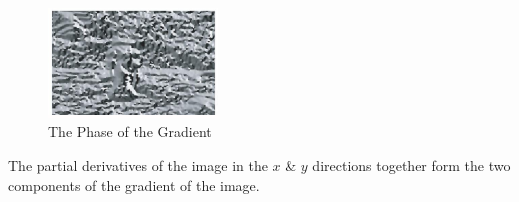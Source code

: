 \documentclass[a4paper,11pt]{article}
\begin{document}
\begin{tcolorbox}[colback=gray!10, colframe=black, title=\textbf{Magnitude Images using First Order Derivatives}]
\begin{multicols}{2}
\begin{figure}[H]
    \centering
    \includegraphics[width=0.4\textwidth]{images/magnitudeimagesfive.png}
    \caption{The Phase of the Gradient}
\end{figure}
\end{multicols}

The partial derivatives of the image in the $x$ \& $y$ directions together form the two components of the gradient of the image.
\end{tcolorbox}
\end{document}
